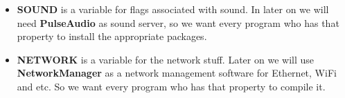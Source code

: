 \documentclass[10pt,a4paper]{article}
\begin{document}
\begin{enumerate}
\begin{enumerate}[label*=\arabic*.]
\begin{itemize}
				
				\begin{itemize}[label={o}]
					\item \textbf{SOUND} is a variable for flags associated with sound. In later on we will need \textbf{PulseAudio} as sound server, so we want every program who has that property to install the appropriate packages.
					
					\item \textbf{NETWORK} is a variable for the network stuff. Later on we will use \textbf{NetworkManager} as a network management software for Ethernet, WiFi and etc. So we want every program who has that property to compile it.
				\end{itemize}
				
			\end{itemize}

		\end{enumerate}		

	\end{enumerate}
	
\end{document}
